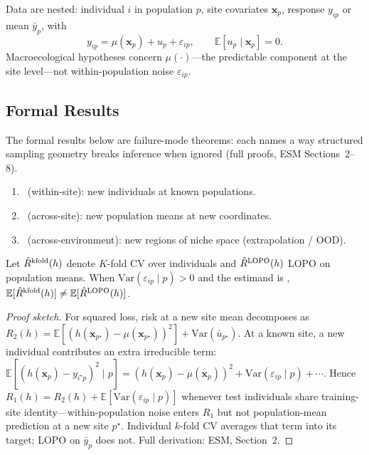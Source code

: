 \documentclass[11pt]{article}
\begin{document}
Data are nested: individual $i$ in population $p$, site covariates
$\mathbf{x}_p$, response $y_{ip}$ or mean $\bar{y}_p$, with
\begin{equation}
  y_{ip} = \mu(\mathbf{x}_p) + u_p + \varepsilon_{ip},
  \qquad \mathbb{E}[u_p \mid \mathbf{x}_p] = 0 .
  \label{eq:nested-generative}
\end{equation}
Macroecological hypotheses concern $\mu(\cdot)$---the predictable component
at the site level---not within-population noise $\varepsilon_{ip}$.

\subsection{Formal Results}
\label{sec:formal-results}

The formal results below are failure-mode theorems: each names a way
structured sampling geometry breaks inference when ignored (full proofs,
ESM Sections~2--8).

\begin{definition}
\label{def:three-estimands}
\begin{enumerate}
  \item \Eone\ (within-site): new individuals at known populations.
  \item \Etwo\ (across-site): new population means at new coordinates.
  \item \Ethree\ (across-environment): new regions of niche space
        (extrapolation / OOD).
\end{enumerate}
\end{definition}

\begin{theorem}
\label{thm:estimand-cv-mismatch}
Let $\hat{R}^{\mathrm{kfold}}(h)$ denote $K$-fold CV over individuals and $\hat{R}^{\mathrm{LOPO}}(h)$
LOPO on population means.  When $\mathrm{Var}(\varepsilon_{ip}\mid
p)>0$ and the estimand is \Etwo, $\mathbb{E}[\hat{R}^{\mathrm{kfold}}(h)] \neq
\mathbb{E}[\hat{R}^{\mathrm{LOPO}}(h)]$.
\end{theorem}

\begin{proof}[Proof sketch]
For squared loss, risk at a new site mean decomposes as
$R_2(h)=\mathbb{E}[(h(\mathbf{x}_{p^\star})-\mu(\mathbf{x}_{p^\star}))^2]
+\mathrm{Var}(\bar{u}_{p^\star})$.  At a known site, a new individual
contributes an extra irreducible term:
$\mathbb{E}[(h(\mathbf{x}_p)-y_{i^\star p})^2\mid p]
=(h(\mathbf{x}_p)-\mu(\mathbf{x}_p))^2+\mathrm{Var}(\varepsilon_{ip}\mid p)
+\cdots$.  Hence $R_1(h)=R_2(h)+\mathbb{E}[\mathrm{Var}(\varepsilon_{ip}\mid p)]$
whenever test individuals share training-site identity---within-population
noise enters $R_1$ but not population-mean prediction at a new site
$p^\star$.  Individual $k$-fold CV averages that term into its target;
LOPO on $\bar{y}_p$ does not.  Full derivation: ESM, Section~2.
\end{proof}
\end{document}
